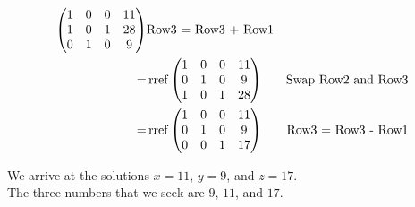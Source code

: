 \documentclass{article}
\begin{document}
\begin{align*}
\begin{pmatrix}
1 & 0 & 0 & 11 \\
1 & 0 & 1 & 28 \\
0 & 1 & 0 & 9
\end{pmatrix} & \text{Row3 = Row3 + Row1} \\
= & \mathop{\rm rref} \begin{pmatrix}
1 & 0 & 0 & 11 \\
0 & 1 & 0 & 9 \\
1 & 0 & 1 & 28 
\end{pmatrix} & \text{Swap Row2 and Row3} \\
= & \mathop{\rm rref} \begin{pmatrix}
1 & 0 & 0 & 11 \\
0 & 1 & 0 & 9 \\
0 & 0 & 1 & 17 
\end{pmatrix} & \text{Row3 = Row3 - Row1} \\
\end{align*}

We arrive at the solutions $x = 11$, $y = 9$, and $z = 17$. \\

The three numbers that we seek are $9$, $11$, and $17$.
\end{document}
